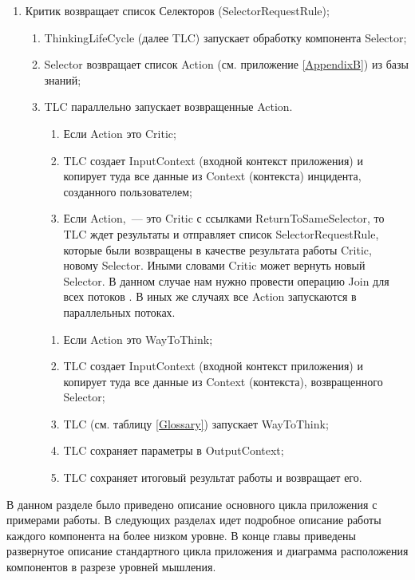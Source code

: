 \begin{enumerate}
	\item Критик возвращает список Селекторов (SelectorRequestRule);
	\begin{enumerate}
	\item ThinkingLifeCycle (далее TLC) запускает обработку компонента Selector;
	\item Selector возвращает список Action (см. приложение \ref{AppendixB}) из базы знаний;
	\item TLC параллельно запускает возвращенные Action.
	\begin{enumerate}
	\item Если Action это Critic;
	\item TLC создает InputContext (входной контекст приложения) и копирует туда все данные из Context (контекста) инцидента, созданного пользователем;
	\item Если Action,~--- это Critic с ссылками ReturnToSameSelector, то TLC ждет результаты и отправляет список SelectorRequestRule, которые были возвращены в качестве результата работы Critic, новому Selector. Иными словами Critic может вернуть новый Selector. В данном случае нам нужно провести операцию Join для всех потоков \cite{JavaConcurrency}. В иных же случаях все Action запускаются в параллельных потоках.
	\end{enumerate} 
	\begin{enumerate}
	\item Если Action это WayToThink;
	\item TLC создает InputContext (входной контекст приложения) и копирует туда все данные из Context (контекста), возвращенного Selector;
	\item TLC (см. таблицу \ref{Glossary}) запускает WayToThink;
	\item TLC сохраняет параметры в OutputContext;
	\item TLC сохраняет итоговый результат работы и возвращает его. 
	\end{enumerate} 
	\end{enumerate}
\end{enumerate} \par
В данном разделе было приведено описание основного цикла приложения с примерами работы. В следующих разделах идет подробное описание работы каждого компонента на более низком уровне. В конце главы приведены развернутое описание стандартного цикла приложения и диаграмма расположения компонентов в разрезе уровней мышления.


